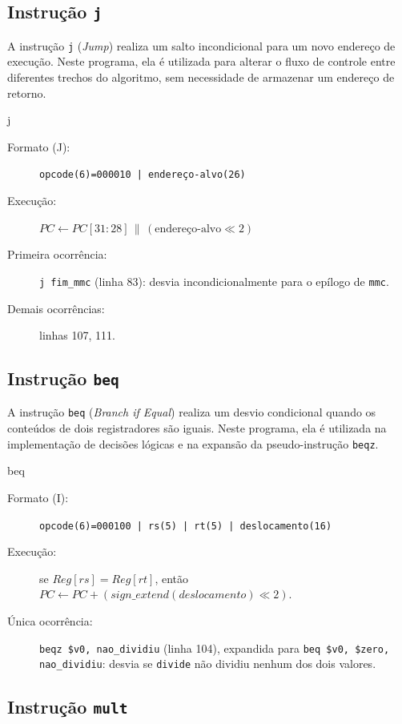 \subsection{Instrução \texttt{j}}

A instrução \texttt{j} (\textit{Jump}) realiza um salto incondicional para um
novo endereço de execução. Neste programa, ela é utilizada para alterar o
fluxo de controle entre diferentes trechos do algoritmo, sem necessidade de
armazenar um endereço de retorno.

\begin{instrucao}{j}
\begin{description}
\item[Formato (J):] \texttt{opcode(6)=000010 | endereço-alvo(26)}
\item[Execução:] $PC \leftarrow PC[31{:}28] \,\|\, (\text{endereço-alvo} \ll 2)$
\item[Primeira ocorrência:] \texttt{j fim\_mmc} (linha 83): desvia
incondicionalmente para o epílogo de \texttt{mmc}.
\item[Demais ocorrências:] linhas 107, 111.
\end{description}
\end{instrucao}

\subsection{Instrução \texttt{beq}}

A instrução \texttt{beq} (\textit{Branch if Equal}) realiza um desvio
condicional quando os conteúdos de dois registradores são iguais. Neste
programa, ela é utilizada na implementação de decisões lógicas e na expansão
da pseudo-instrução \texttt{beqz}.

\begin{instrucao}{beq}
\begin{description}
\item[Formato (I):] \texttt{opcode(6)=000100 | rs(5) | rt(5) | deslocamento(16)}
\item[Execução:] se $Reg[rs] = Reg[rt]$, então
$PC \leftarrow PC + (sign\_extend(deslocamento) \ll 2)$.
\item[Única ocorrência:] \texttt{beqz \$v0, nao\_dividiu}
(linha 104), expandida para \texttt{beq \$v0, \$zero, nao\_dividiu}:
desvia se \texttt{divide} não dividiu nenhum dos dois valores.
\end{description}
\end{instrucao}

\subsection{Instrução \texttt{mult}}

